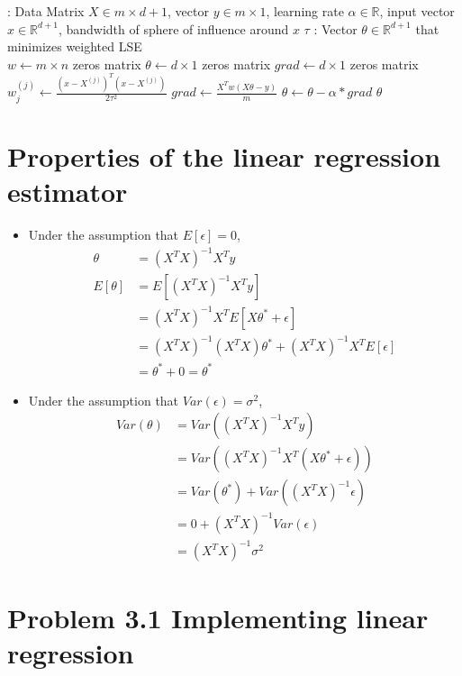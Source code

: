\documentclass[pdftex,11pt]{article}
\begin{document}
\begin{itemize}
\begin{algorithm}
  \begin{algorithmic}
  	: Data Matrix $X \in m\times d+1$, vector $y\in m\times 1$, learning rate $\alpha\in \mathbb{R}$, input vector $x\in\mathbb{R}^{d+1}$, bandwidth of sphere of influence around $x$ $\tau$
	: Vector $\theta\in\mathbb{R}^{d+1}$ that minimizes weighted LSE\\
	\State $w\gets m\times n$ zeros matrix
	\State $\theta\gets d\times 1$ zeros matrix
	\State $grad\gets d\times 1$ zeros matrix
	\State $w_j^{(j)}\gets\frac{(x-X^{(j)})^T(x-X^{(j)})}{2\tau^2}$
	\EndFor
	 
	\State $grad\gets\frac{X^Tw(X\theta-y)}{m}$
	\State $\theta\gets\theta-\alpha*grad$
	\EndFor
	\State \Return $\theta$
  \end{algorithmic}
\end{algorithm}
\end{itemize}

\section{Properties of the linear regression estimator}
\begin{itemize}
\item Under the assumption that $E[\epsilon]=0$,
	\begin{align*}
		\theta&=(X^TX)^{-1}X^Ty\\
		E[\theta]&=E[(X^TX)^{-1}X^Ty]\\
		&=(X^TX)^{-1}X^TE[X\theta^*+\epsilon]\\
		&=(X^TX)^{-1}(X^TX)\theta^*+(X^TX)^{-1}X^TE[\epsilon]\\
		&=\theta^*+0=\theta^*
	\end{align*}
\item Under the assumption that $Var(\epsilon)=\sigma^2$,
	\begin{align*}
		Var(\theta)&=Var((X^TX)^{-1}X^Ty)\\
		&=Var((X^TX)^{-1}X^T(X\theta^*+\epsilon))\\
		&=Var(\theta^*)+Var((X^TX)^{-1}\epsilon)\\
		&=0+(X^TX)^{-1}Var(\epsilon)\\
		&=(X^TX)^{-1}\sigma^2
	\end{align*}
\end{itemize}

\section{Problem 3.1 Implementing linear regression}
\end{document}
